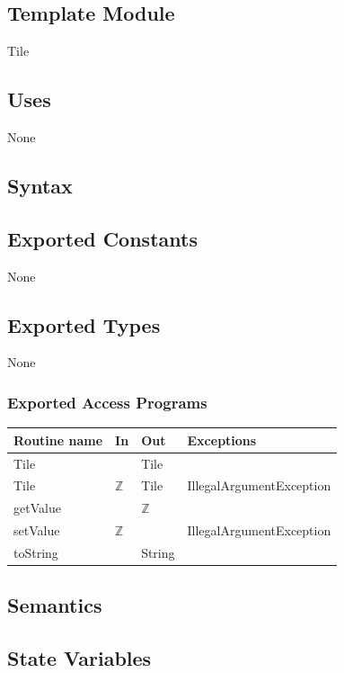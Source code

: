 \documentclass[12pt]{article}
\begin{document}
\subsection* {Template Module}

Tile

\subsection*{Uses}

None

\subsection* {Syntax}

\subsection*{Exported Constants}

None

\subsection*{Exported Types}

None

\subsubsection* {Exported Access Programs}

\begin{tabular}{| l | l | l | p{6cm} |}
\hline
\textbf{Routine name} & \textbf{In} & \textbf{Out} & \textbf{Exceptions}\\
\hline
Tile & ~ & Tile & \\
\hline
Tile & $\mathbb{Z}$ & Tile & IllegalArgumentException\\
\hline
getValue & & $\mathbb{Z}$ & \\
\hline
setValue & $\mathbb{Z}$ &  & IllegalArgumentException\\
\hline
toString &  & String & \\
\hline
\end{tabular}

\subsection* {Semantics}

\subsection*{State Variables}
\end{document}
